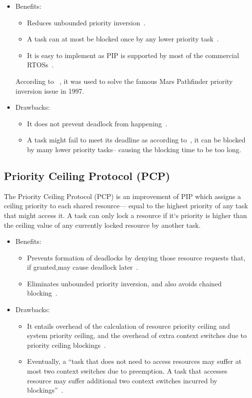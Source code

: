 \begin{itemize}
    \item Benefits: 
    \begin{itemize}
        \item Reduces unbounded priority inversion~\cite{JiacunWang.2017}.
        \item A task can at most be blocked once by any lower priority task~\cite{JiacunWang.2017}.
        \item It is easy to implement as PIP is supported by most of the commercial RTOSs~\cite{JiacunWang.2017}.
    \end{itemize}
    According to ~\cite{JiacunWang.2017}, it was used to solve the famous Mars Pathfinder priority inversion issue in 1997.
    \item Drawbacks:
    \begin{itemize}
        \item It does not prevent deadlock from happening~\cite{JiacunWang.2017}.
        \item A task might fail to meet its deadline as according to~\cite{JiacunWang.2017}, it can be blocked by many lower priority tasks-- causing the blocking time to be too long.
    \end{itemize}
\end{itemize}
\subsection{Priority Ceiling Protocol (PCP)}
The Priority Ceiling Protocol (PCP) is an improvement of PIP which assigns a ceiling priority to each shared resource--- equal to the highest priority of any task that might access it. A task can only lock a resource if it`s priority is higher than the ceiling value of any currently locked resource by another task.
\begin{itemize}
    \item Benefits: 
    \begin{itemize}
        \item Prevents formation of deadlocks by denying those resource requests that, if granted,may cause deadlock later~\cite{JiacunWang.2017}.
        \item Eliminates unbounded priority inversion, and also avoids chained blocking~\cite{JiacunWang.2017}.
    \end{itemize}
    \item Drawbacks:
    \begin{itemize}
        \item It entails overhead of the calculation of resource priority ceiling and system priority ceiling, and the overhead of extra context switches due to priority ceiling blockings~\cite{JiacunWang.2017}.
        \item Eventually, a ``task that does not need to access resources may suffer at most two context switches due to preemption. A task that accesses resource may suffer additional two context switches incurred by blockings''~\cite{JiacunWang.2017}.
    \end{itemize}
\end{itemize}
